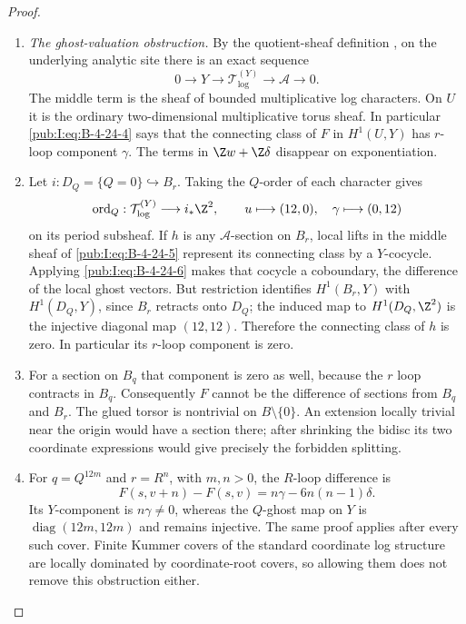 \begin{proof}
\begin{enumerate}[label=\arabic*.,leftmargin=*]
\item \emph{The ghost-valuation obstruction.}
By the quotient-sheaf definition
\citep[Sections 1.3.1--1.3.4, pp.~81--82]{KKN2008Root},
on the underlying analytic site there is an exact sequence
\begin{equation}
 0\longrightarrow Y\longrightarrow
 \mathcal T_{\log}^{(Y)}\longrightarrow
 \mathcal A\longrightarrow0.
\label{pub:I:eq:B-4-24-5}
\end{equation}
The middle term is the sheaf of bounded multiplicative
log characters. On $U$ it is the ordinary
two-dimensional multiplicative torus sheaf.
In particular \eqref{pub:I:eq:B-4-24-4} says that the connecting
class of $F$ in $H^1(U,Y)$ has $r$-loop component
$\gamma$. The terms in $\Z w+\Z\delta$ disappear
on exponentiation.

\item Let $i:D_Q=\{Q=0\}\hookrightarrow B_r$.
Taking the $Q$-order of each character gives
\begin{equation}
 \operatorname{ord}_Q:
 \mathcal T_{\log}^{(Y)}\longrightarrow i_*\Z^2,
 \qquad
 u\longmapsto(12,0),\quad
 \gamma\longmapsto(0,12)
\label{pub:I:eq:B-4-24-6}
\end{equation}
on its period subsheaf. If $h$ is any
$\mathcal A$-section on $B_r$, local lifts in
the middle sheaf of \eqref{pub:I:eq:B-4-24-5} represent its
connecting class by a $Y$-cocycle. Applying
\eqref{pub:I:eq:B-4-24-6} makes that cocycle a coboundary,
the difference of the local ghost vectors.
But restriction identifies $H^1(B_r,Y)$ with
$H^1(D_Q,Y)$, since $B_r$ retracts onto $D_Q$;
the induced map to $H^1(D_Q,\Z^2)$ is the
injective diagonal map $(12,12)$. Therefore
the connecting class of $h$ is zero. In
particular its $r$-loop component is zero.

\item For a section on $B_q$ that component is zero
as well, because the $r$ loop contracts in $B_q$.
Consequently $F$ cannot be the difference of
sections from $B_q$ and $B_r$. The glued torsor
is nontrivial on $B\setminus\{0\}$. An extension
locally trivial near the origin would have a
section there; after shrinking the bidisc its
two coordinate expressions would give precisely
the forbidden splitting.

\item For $q=Q^{12m}$ and $r=R^n$, with $m,n>0$,
the $R$-loop difference is
\[
 F(s,v+n)-F(s,v)
    =n\gamma-6n(n-1)\delta.
\]
Its $Y$-component is $n\gamma\ne0$,
whereas the $Q$-ghost map on $Y$ is
$\operatorname{diag}(12m,12m)$ and remains
injective. The same proof applies after every
such cover. Finite Kummer covers of the standard
coordinate log structure are locally dominated
by coordinate-root covers, so allowing them
does not remove this obstruction either.


\end{enumerate}
\end{proof}
